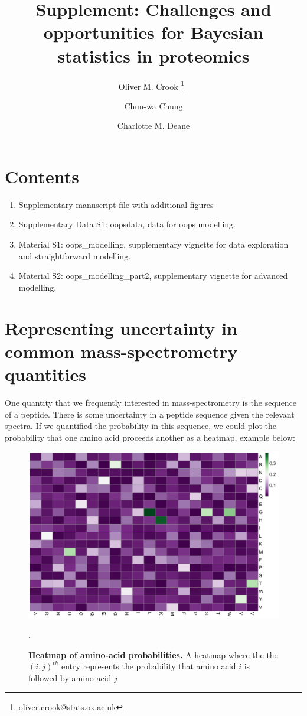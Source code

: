 \documentclass[12pt,english, journal=jpr, layout=twocolumn]{article}
\title{Supplement: Challenges and opportunities for Bayesian statistics in proteomics}
\author[1]{Oliver M. Crook \thanks{\url{oliver.crook@stats.ox.ac.uk}}~}
\author[2]{Chun-wa Chung}
\author[1]{Charlotte M. Deane}
\begin{document}
\maketitle
\section{Contents}
\begin{enumerate}
\item Supplementary manuscript file with additional figures
\item Supplementary Data S1: oopsdata, data for oops modelling.
\item Material S1: oops\_modelling, supplementary vignette for data exploration and straightforward modelling.
\item Material S2: oops\_modelling\_part2, supplementary vignette for advanced modelling.
\end{enumerate}


\clearpage	
\section{Representing uncertainty in common mass-spectrometry quantities}
One quantity that we frequently interested in mass-spectrometry is the sequence of a peptide. There is some uncertainty in a peptide sequence given the relevant spectra. If we quantified the probability in this sequence, we could plot the probability that one amino acid proceeds another as a heatmap, example below:

\begin{figure}[H]
	\centering
	\includegraphics[width =1\textwidth]{probabilityaminoacids.pdf}
	\caption{\textbf{Heatmap of amino-acid probabilities.} A heatmap where the the $(i,j)^{th}$ entry represents the probability that amino acid $i$ is followed by amino acid $j$}.
	\label{figure::figure1aa}
\end{figure}
\end{document}
